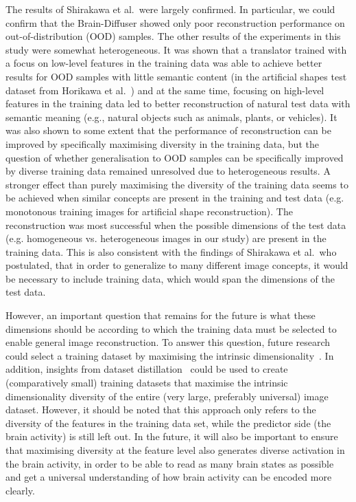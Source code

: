 The results of Shirakawa et al.\ were largely confirmed. In particular, we could confirm that the Brain-Diffuser showed only poor reconstruction performance on out-of-distribution (OOD) samples. The other results of the experiments in this study were somewhat heterogeneous. It was shown that a translator trained with a focus on low-level features in the training data was able to achieve better results for OOD samples with little semantic content (in the artificial shapes test dataset from Horikawa et al.~\cite{horikawaGenericDecodingSeen2017}) and at the same time, focusing on high-level features in the training data led to better reconstruction of natural test data with semantic meaning (e.g., natural objects such as animals, plants, or vehicles). It was also shown to some extent that the performance of reconstruction can be improved by specifically maximising diversity in the training data, but the question of whether generalisation to OOD samples can be specifically improved by diverse training data remained unresolved due to heterogeneous results. A stronger effect than purely maximising the diversity of the training data seems to be achieved when similar concepts are present in the training and test data (e.g. monotonous training images for artificial shape reconstruction). The reconstruction was most successful when the possible dimensions of the test data (e.g. homogeneous vs. heterogeneous images in our study) are present in the training data. This is also consistent with the findings of Shirakawa et al.\ who postulated, that in order to generalize to many different image concepts, it would be necessary to include training data, which would span the dimensions of the test data.

However, an important question that remains for the future is what these dimensions should be according to which the training data must be selected to enable general image reconstruction. To answer this question, future research could select a training dataset by maximising the intrinsic dimensionality~\cite{popeIntrinsicDimensionImages2021}. In addition, insights from dataset distillation~\cite{wangDatasetDistillation2018} could be used to create (comparatively small) training datasets that maximise the intrinsic dimensionality diversity of the entire (very large, preferably universal) image dataset. However, it should be noted that this approach only refers to the diversity of the features in the training data set, while the predictor side (the brain activity) is still left out. In the future, it will also be important to ensure that maximising diversity at the feature level also generates diverse activation in the brain activity, in order to be able to read as many brain states as possible and get a universal understanding of how brain activity can be encoded more clearly.


